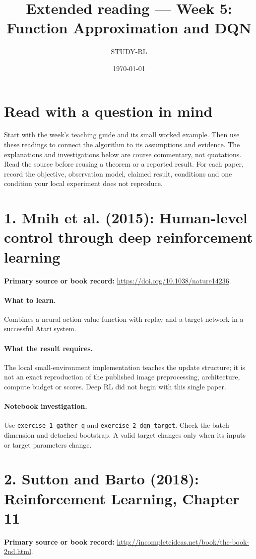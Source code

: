 \documentclass[11pt]{scrartcl}
\title{Extended reading --- Week 5: Function Approximation and DQN}
\author{STUDY-RL}
\date{\today}
\begin{document}
\maketitle
\section*{Read with a question in mind}
Start with the week's teaching guide and its small worked example. Then use
these readings to connect the algorithm to its assumptions and evidence.
The explanations and investigations below are course commentary, not
quotations. Read the source before reusing a theorem or a reported result.
For each paper, record the objective, observation model, claimed result,
conditions and one condition your local experiment does not reproduce.

\section*{1. Mnih et al. (2015): Human-level control through deep reinforcement learning}
\textbf{Primary source or book record:} \url{https://doi.org/10.1038/nature14236}.

\paragraph{What to learn.} Combines a neural action-value function with replay and a target network in a successful Atari system.

\paragraph{What the result requires.} The local small-environment implementation teaches the update structure; it is not an exact reproduction of the published image preprocessing, architecture, compute budget or scores. Deep RL did not begin with this single paper.

\paragraph{Notebook investigation.} Use \texttt{exercise\_1\_gather\_q} and \texttt{exercise\_2\_dqn\_target}. Check the batch dimension and detached bootstrap. A valid target changes only when its inputs or target parameters change.

\section*{2. Sutton and Barto (2018): Reinforcement Learning, Chapter 11}
\textbf{Primary source or book record:} \url{http://incompleteideas.net/book/the-book-2nd.html}.
\end{document}
